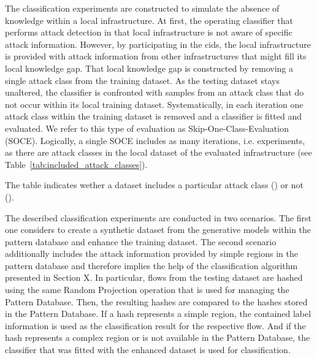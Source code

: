 \documentclass[../../main.tex]{subfiles}
\begin{document}
The classification experiments are constructed to simulate the absence of knowledge within a local infrastructure. At first, the operating classifier that performs attack detection in that local infrastructure is not aware of specific attack information. However, by participating in the \gls{cids}, the local infrastructure is provided with attack information from other infrastructures that might fill its local knowledge gap. That local knowledge gap is constructed by removing a single attack class from the training dataset. As the testing dataset stays unaltered, the classifier is confronted with samples from an attack class that do not occur within its local training dataset. Systematically, in each iteration one attack class within the training dataset is removed and a classifier is fitted and evaluated. We refer to this type of evaluation as Skip-One-Class-Evaluation (SOCE). Logically, a single SOCE includes as many iterations, i.e. experiments, as there are attack classes in the local dataset of the evaluated infrastructure (see Table~\ref{tab:included_attack_classes}).

\begin{table}[H]
    \footnotesize
    \centering
    \setlength{\extrarowheight}{0pt}
    \addtolength{\extrarowheight}{\aboverulesep}
    \addtolength{\extrarowheight}{\belowrulesep}
    \setlength{\aboverulesep}{0pt}
    \setlength{\belowrulesep}{0pt}
    \setlength{\extrarowheight}{.1em}
     
    \caption[Attack Classes Included in the Datasets]{The table indicates wether a dataset includes a particular attack class (\cmark) or not (\xmark).}
    \label{tab:included_attack_classes}
\end{table}

The described classification experiments are conducted in two scenarios. The first one considers to create a synthetic dataset from the generative models within the pattern database and enhance the training dataset. The second scenario additionally includes the attack information provided by simple regions in the pattern database and therefore implies the help of the classification algorithm presented in Section X. In particular, flows from the testing dataset are hashed using the same Random Projection operation that is used for managing the Pattern Database. Then, the resulting hashes are compared to the hashes stored in the Pattern Database. If a hash represents a simple region, the contained label information is used as the classification result for the respective flow. And if the hash represents a complex region or is not available in the Pattern Database, the classifier that was fitted with the enhanced dataset is used for classification. 
\end{document}
